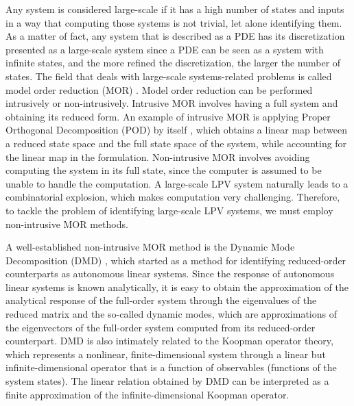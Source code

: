 %
Any system is considered large-scale if it has a high number of states and inputs in a way that computing those systems is not trivial, let alone identifying them.
%
As a matter of fact, any system that is described as a PDE has its discretization presented as a large-scale system since a PDE can be seen as a system with infinite states, and the more refined the discretization, the larger the number of states.
%
The field that deals with large-scale systems-related problems is called model order reduction (MOR) \cite{dragoslav}.
%
Model order reduction can be performed intrusively or non-intrusively.
%
Intrusive MOR involves having a full system and obtaining its reduced form.
%
An example of intrusive MOR is applying Proper Orthogonal Decomposition (POD) by itself \cite{Chatu2010}, which obtains a linear map between a reduced state space and the full state space of the system, while accounting for the linear map in the formulation.
%
Non-intrusive MOR involves avoiding computing the system in its full state, since the computer is assumed to be unable to handle the computation.
%
A large-scale LPV system naturally leads to a combinatorial explosion, which makes computation very challenging. Therefore, to tackle the problem of identifying large-scale LPV systems, we must employ non-intrusive MOR methods.


A well-established non-intrusive MOR method is the Dynamic Mode Decomposition (DMD) \cite{Schmid2022}, which started as a method for identifying reduced-order counterparts as autonomous linear systems.
%
Since the response of autonomous linear systems is known analytically, it is easy to obtain the approximation of the analytical response of the full-order system through the eigenvalues of the reduced matrix and the so-called dynamic modes, which are approximations of the eigenvectors of the full-order system computed from its reduced-order counterpart.
%
DMD is also intimately related to the Koopman operator theory, which represents a nonlinear, finite-dimensional system through a linear but infinite-dimensional operator that is a function of observables (functions of the system states).
%
The linear relation obtained by DMD can be interpreted as a finite approximation of the infinite-dimensional Koopman operator.


